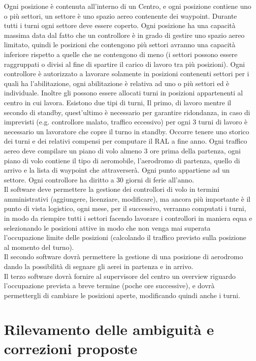 Ogni posizione è contenuta all'interno di un Centro, e ogni posizione contiene uno o più settori, un settore è uno spazio aereo contenente dei waypoint. Durante tutti i turni ogni settore deve essere coperto. 
Ogni posizione ha una capacità massima data dal fatto che un controllore è in grado di gestire uno spazio aereo limitato, quindi le posizioni che contengono più settori avranno una capacità inferiore rispetto a quelle che ne contengono di meno (i settori possono essere raggruppati o divisi al fine di spartire il carico di lavoro tra più posizioni).
Ogni controllore è autorizzato a lavorare solamente in posizioni contenenti settori per i quali ha l’abilitazione, ogni abilitazione è relativa ad uno o più settori ed è individuale. Inoltre gli possono essere allocati turni in posizioni appartenenti al centro in cui lavora.
Esistono due tipi di turni, Il primo, di lavoro mentre il secondo di standby, quest'ultimo è necessario per garantire ridondanza, in caso di imprevisti (e.g. controllore malato, traffico eccessivo)
per ogni 3 turni di lavoro è necessario un lavoratore che copre il turno in standby. Occorre tenere uno storico dei turni e dei relativi compensi per computare il RAL a fine anno.
Ogni traffico aereo deve compilare un piano di volo almeno 3 ore prima della partenza, ogni piano di volo contiene il tipo di aeromobile, l'aerodromo di partenza, quello di arrivo e la lista di waypoint che attraverserà.
Ogni punto appartiene ad un settore.
Ogni controllore ha diritto a 30 giorni di ferie all'anno.\\
Il software deve permettere la gestione dei controllori di volo in termini amministrativi (aggiungere, licenziare, modificare), 
ma ancora più importante è il punto di vista logistico, ogni mese, per il successivo, verranno computati i turni, in modo da riempire tutti i settori facendo lavorare i controllori in maniera equa e selezionando le posizioni attive in modo che non venga mai superata l'occupazione limite delle posizioni (calcolando il traffico previsto sulla posizione al momento del turno).\\
Il secondo software dovrà permettere la gestione di una posizione di aerodromo dando la possibilità di segnare gli aerei in partenza e in arrivo.\\
Il terzo software dovrà fornire al supervisore del centro un overview riguardo l'occupazione prevista a breve termine (poche ore successive), e dovrà permettergli di cambiare le posizioni aperte, modificando quindi anche i turni.\\
\section{Rilevamento delle ambiguità e correzioni proposte}

